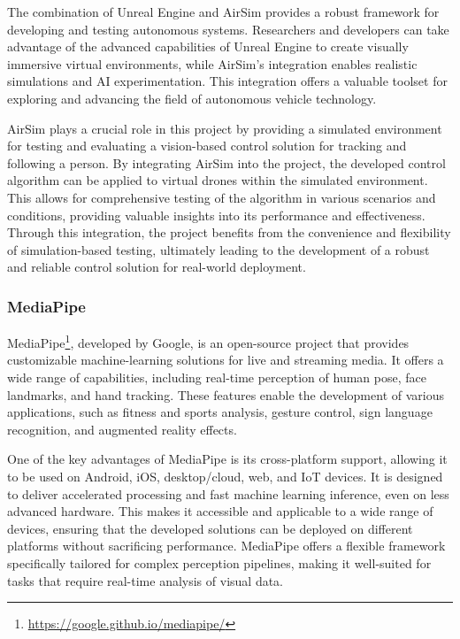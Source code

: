 The combination of Unreal Engine and AirSim provides a robust framework for developing and testing autonomous systems. Researchers and developers can take advantage of the advanced capabilities of Unreal Engine to create visually immersive virtual environments, while AirSim's integration enables realistic simulations and AI experimentation. This integration offers a valuable toolset for exploring and advancing the field of autonomous vehicle technology.

AirSim plays a crucial role in this project by providing a simulated environment for testing and evaluating a vision-based control solution for tracking and following a person. By integrating AirSim into the project, the developed control algorithm can be applied to virtual drones within the simulated environment. This allows for comprehensive testing of the algorithm in various scenarios and conditions, providing valuable insights into its performance and effectiveness. Through this integration, the project benefits from the convenience and flexibility of simulation-based testing, ultimately leading to the development of a robust and reliable control solution for real-world deployment.


\subsubsection{MediaPipe}
\label{subsec:mediapipe}
MediaPipe\footnote{\url{https://google.github.io/mediapipe/}}, developed by Google, is an open-source project that provides customizable machine-learning solutions for live and streaming media. It offers a wide range of capabilities, including real-time perception of human pose, face landmarks, and hand tracking. These features enable the development of various applications, such as fitness and sports analysis, gesture control, sign language recognition, and augmented reality effects.

One of the key advantages of MediaPipe is its cross-platform support, allowing it to be used on Android, iOS, desktop/cloud, web, and IoT devices. It is designed to deliver accelerated processing and fast machine learning inference, even on less advanced hardware. This makes it accessible and applicable to a wide range of devices, ensuring that the developed solutions can be deployed on different platforms without sacrificing performance.
MediaPipe offers a flexible framework specifically tailored for complex perception pipelines, making it well-suited for tasks that require real-time analysis of visual data. 

